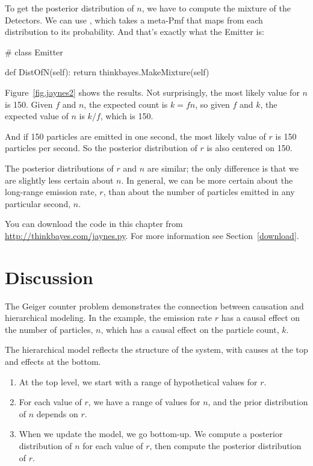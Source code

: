 \documentclass[12pt]{book}
\theoremstyle{exercise}
\begin{document}
To get the posterior distribution of $n$, we have to compute
the mixture of the Detectors.  We can use 
, which takes a meta-Pmf that maps
from each distribution to its probability.  And that's exactly
what the Emitter is:

\begin{code}
# class Emitter

    def DistOfN(self):
        return thinkbayes.MakeMixture(self)
\end{code}

Figure~\ref{fig.jaynes2} shows the results.  Not surprisingly, the
most likely value for $n$ is 150.  Given $f$ and $n$, the expected
count is $k = f n$, so given $f$ and $k$, the expected value of $n$ is
$k / f$, which is 150.

And if 150 particles are emitted in one second, the most likely value
of $r$ is 150 particles per second.  So the posterior distribution of
$r$ is also centered on 150.

The posterior distributions of $r$ and $n$ are similar;
the only difference is that we are slightly less certain about $n$.
In general, we can be more certain about the long-range emission rate,
$r$, than about the number of particles emitted in any particular second,
$n$.

You can download the code in this chapter from
\url{http://thinkbayes.com/jaynes.py}.  For more information see
Section~\ref{download}.


\section{Discussion}

The Geiger counter problem demonstrates the connection between
causation and hierarchical modeling.  In the example, the
emission rate $r$ has a causal effect on the number of particles,
$n$, which has a causal effect on the particle count, $k$.

The hierarchical model reflects the structure of the
system, with causes at the top and effects at the bottom.

\begin{enumerate}

\item At the top level, we start with a range of hypothetical
values for $r$.

\item For each value of $r$, we have a range of values for $n$,
and the prior distribution of $n$ depends on $r$.

\item When we update the model, we go bottom-up.  We compute
a posterior distribution of $n$ for each value of $r$, then
compute the posterior distribution of $r$.

\end{enumerate}
\end{document}
